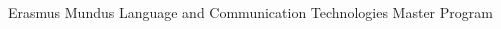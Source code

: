 
\begin{projects}{99}

    \item Erasmus Mundus Language and Communication Technologies Master Program
    
\end{projects}
